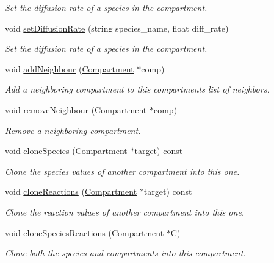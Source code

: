\begin{DoxyCompactItemize}
\begin{DoxyCompactList}\small\item\em Set the diffusion rate of a species in the compartment. \end{DoxyCompactList}\item 
void \hyperlink{classCompartment_a2b2062ef6bd7abb8903307415ce4d658}{set\+Diffusion\+Rate} (string species\+\_\+name, float diff\+\_\+rate)
\begin{DoxyCompactList}\small\item\em Set the diffusion rate of a species in the compartment. \end{DoxyCompactList}\item 
void \hyperlink{classCompartment_a0c5f51cbf499c47977f661237536cce7}{add\+Neighbour} (\hyperlink{classCompartment}{Compartment} $\ast$comp)
\begin{DoxyCompactList}\small\item\em Add a neighboring compartment to this compartments list of neighbors. \end{DoxyCompactList}\item 
void \hyperlink{classCompartment_aefaf5a8cf81768c3ddc67c4fa5b77b19}{remove\+Neighbour} (\hyperlink{classCompartment}{Compartment} $\ast$comp)
\begin{DoxyCompactList}\small\item\em Remove a neighboring compartment. \end{DoxyCompactList}\item 
void \hyperlink{classCompartment_aa6a6d1464a9467a70d570360a72e5b53}{clone\+Species} (\hyperlink{classCompartment}{Compartment} $\ast$target) const 
\begin{DoxyCompactList}\small\item\em Clone the species values of another compartment into this one. \end{DoxyCompactList}\item 
void \hyperlink{classCompartment_af8538b90eadb44d2e9fec4bdca5f2fc0}{clone\+Reactions} (\hyperlink{classCompartment}{Compartment} $\ast$target) const 
\begin{DoxyCompactList}\small\item\em Clone the reaction values of another compartment into this one. \end{DoxyCompactList}\item 
void \hyperlink{classCompartment_a584356f59eedb57136647019a66df110}{clone\+Species\+Reactions} (\hyperlink{classCompartment}{Compartment} $\ast$C)
\begin{DoxyCompactList}\small\item\em Clone both the species and compartments into this compartment. \end{DoxyCompactList}\item 

\end{DoxyCompactItemize}
